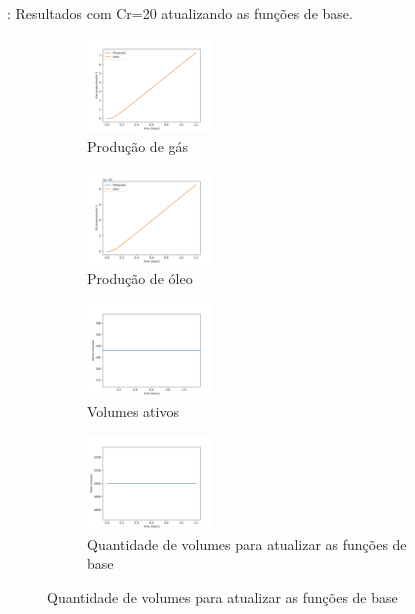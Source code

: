 \documentclass[professionalfont]{beamer}
\begin{document}
\begin{frame}{\FrameProblemName: {\small Resultados com Cr=20 atualizando as funções de base.}}
    \begin{figure}[!ht]
        \centering
        \begin{subfigure}{.48\textwidth}
            \centering
            \includegraphics[height=2.5cm   ]{./imgs/pr2/3k_5000x1x1/cr 20/v2/update/svgtopng/figura_case-finescale_3k_5000_CR20_updateGas_production.png}
            \caption{Produção de gás}
        \end{subfigure}
        \hfill
        \begin{subfigure}{.48\textwidth}
            \centering
            \includegraphics[height=2.5cm]{./imgs/pr2/3k_5000x1x1/cr 20/v2/update/svgtopng/figura_case-finescale_3k_5000_CR20_updateOil_production.png}
            \caption{Produção de óleo}
        \end{subfigure}
        \bigskip
        \begin{subfigure}{.48\textwidth}
            \centering
            \includegraphics[height=2.5cm]{./imgs/pr2/3k_5000x1x1/cr 20/v2/update/svgtopng/figura_case-finescale_3k_5000_CR20_updateActive_volumes.png}
            \caption{Volumes ativos}
        \end{subfigure}
        \hfill
        \begin{subfigure}{.48\textwidth}
            \centering
            \includegraphics[height=2.5cm]{./imgs/pr2/3k_5000x1x1/cr 20/v2/update/svgtopng/figura_case-finescale_3k_5000_CR20_updateTotal volumes.png}
            \caption{Quantidade de volumes para atualizar as funções de base}
        \end{subfigure}
        \label{fig:fig2_pr2-cr20}
        
    \end{figure}
\end{frame}
\end{document}
